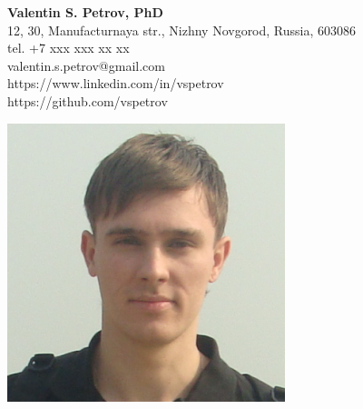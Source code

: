 \documentclass[line,margin,12pt]{res}
\begin{document}
\begin{multicols}{2}
\begin{flushright}
{\large \bf Valentin S. Petrov, PhD} \\
{\footnotesize
12, 30, Manufacturnaya str., Nizhny Novgorod, Russia, 603086 \\
tel. +7 xxx xxx xx xx \\
valentin.s.petrov@gmail.com\\
https://www.linkedin.com/in/vspetrov\\
https://github.com/vspetrov}
\end{flushright}

\columnbreak
\includegraphics[scale=0.28]{image.png}
\end{multicols}
\end{document}
